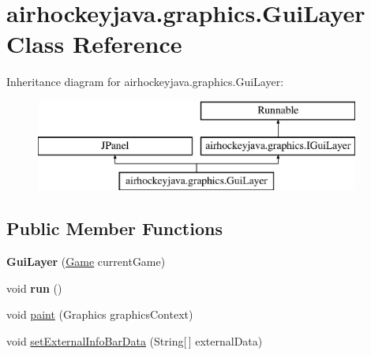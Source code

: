 \hypertarget{classairhockeyjava_1_1graphics_1_1_gui_layer}{}\section{airhockeyjava.\+graphics.\+Gui\+Layer Class Reference}
\label{classairhockeyjava_1_1graphics_1_1_gui_layer}
Inheritance diagram for airhockeyjava.\+graphics.\+Gui\+Layer\+:\begin{figure}[H]
\begin{center}
\leavevmode
\includegraphics[height=3.000000cm]{classairhockeyjava_1_1graphics_1_1_gui_layer}
\end{center}
\end{figure}
\subsection*{Public Member Functions}
\begin{DoxyCompactItemize}
\item 
\hypertarget{classairhockeyjava_1_1graphics_1_1_gui_layer_a12aff437bcac637c99207743b86bd5a3}{}{\bfseries Gui\+Layer} (\hyperlink{classairhockeyjava_1_1game_1_1_game}{Game} current\+Game)\label{classairhockeyjava_1_1graphics_1_1_gui_layer_a12aff437bcac637c99207743b86bd5a3}

\item 
\hypertarget{classairhockeyjava_1_1graphics_1_1_gui_layer_a7232f813e44be5023954d8fb441a28b7}{}void {\bfseries run} ()\label{classairhockeyjava_1_1graphics_1_1_gui_layer_a7232f813e44be5023954d8fb441a28b7}

\item 
void \hyperlink{classairhockeyjava_1_1graphics_1_1_gui_layer_acd017d984424d676782e80f69286f31b}{paint} (Graphics graphics\+Context)
\item 
void \hyperlink{classairhockeyjava_1_1graphics_1_1_gui_layer_afeb03f9c930acca4e90f5071e7809f16}{set\+External\+Info\+Bar\+Data} (String\mbox{[}$\,$\mbox{]} external\+Data)
\end{DoxyCompactItemize}
